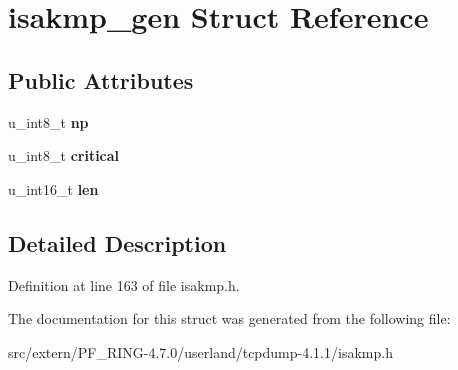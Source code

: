 \hypertarget{structisakmp__gen}{
\section{isakmp\_\-gen Struct Reference}
\label{structisakmp__gen}
}
\subsection*{Public Attributes}
\begin{DoxyCompactItemize}
\item 
\hypertarget{structisakmp__gen_aa5d7d64c7d740317ae51264c1d05098d}{
u\_\-int8\_\-t {\bfseries np}}
\label{structisakmp__gen_aa5d7d64c7d740317ae51264c1d05098d}

\item 
\hypertarget{structisakmp__gen_af12e5fb38783dcd98d93a501a47243bd}{
u\_\-int8\_\-t {\bfseries critical}}
\label{structisakmp__gen_af12e5fb38783dcd98d93a501a47243bd}

\item 
\hypertarget{structisakmp__gen_ac9afada60c24d4b60b405f48d1cfeb35}{
u\_\-int16\_\-t {\bfseries len}}
\label{structisakmp__gen_ac9afada60c24d4b60b405f48d1cfeb35}

\end{DoxyCompactItemize}


\subsection{Detailed Description}


Definition at line 163 of file isakmp.h.



The documentation for this struct was generated from the following file:\begin{DoxyCompactItemize}
\item 
src/extern/PF\_\-RING-\/4.7.0/userland/tcpdump-\/4.1.1/isakmp.h\end{DoxyCompactItemize}
